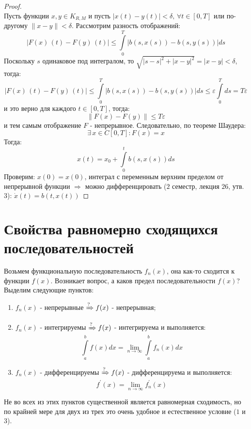 \documentclass[12pt]{article}
\newcommand{\VE}{\varepsilon}
\theoremstyle{definition}
\newcommand{\ddint}[2]{\displaystyle\int\limits_{#1}^{#2}}
\begin{document}
\begin{proof}
$$	$$
	Пусть функции $x,y \in K_{R,M}$ и пусть $|x(t) - y(t)| < \delta, \, \forall t \in [0,T]$ или по-другому $\|x - y\| < \delta$. Рассмотрим разность отображений:
	$$
		|F(x)\,(t) - F(y)\,(t)| \leq \ddint{0}{T}|b(s,x(s)) - b(s,y(s))|ds
	$$
	Поскольку $s$ одинаковое под интегралом, то $\sqrt{|s - s|^2 + |x - y|^2} = |x-y| < \delta$, тогда:
	$$
		|F(x)\,(t) - F(y)\,(t)| \leq \ddint{0}{T}|b(s,x(s)) - b(s,y(s))|ds \leq \VE \ddint{0}{T}ds = T\VE
	$$
	и это верно для каждого $t \in [0,T]$, тогда:
	$$
		\|F(x) - F(y)\| \leq T\VE
	$$
	и тем самым отображение $F$ - непрерывное. Следовательно, по теореме Шаудера:
	$$
		\exists \, x \in C[0,T]\colon F(x) = x
	$$
	Тогда:
	$$
		x(t) = x_0 + \ddint{0}{t}b(s,x(s))ds
	$$
	Проверим: $x(0) = x(0)$, интеграл с переменным верхним пределом от непрерывной функции $\Rightarrow$ можно дифференцировать ($2$ семестр, лекция $26$, утв. $3$): $\dot{x}(t) = b(t,x(t))$
\end{proof}
\newpage
\section*{Свойства равномерно сходящихся последовательностей}
Возьмем функциональную последовательность $f_n(x)$, она как-то сходится к функции $f(x)$. Возникает вопрос, а каков предел последовательности $f(x)$? Выделим следующие пунктов:
\begin{enumerate}[label ={(\arabic*)}]
	\item $f_n(x)$ - непрерывные $\xRightarrow[]{?} f(x)$ - непрерывная; 
	\item $f_n(x)$ - интегрируемы $\xRightarrow[]{?} f(x)$ - интегрируема и выполняется:
	$$
		\ddint{a}{b}f(x)dx = \lim\limits_{n \to \infty}\ddint{a}{b}f_n(x)dx
	$$
	\item $f_n(x)$ - дифференцируемы $\xRightarrow[]{?} f(x)$ - дифференцируема и выполняется:
	$$
		f^\prime(x) = \lim\limits_{n \to \infty}f_n^\prime(x)
	$$
\end{enumerate}
Не во всех из этих пунктов существенной является равномерная сходимость, но по крайней мере для двух из трех это очень удобное и естественное условие ($1$ и $3$).
\end{document}
